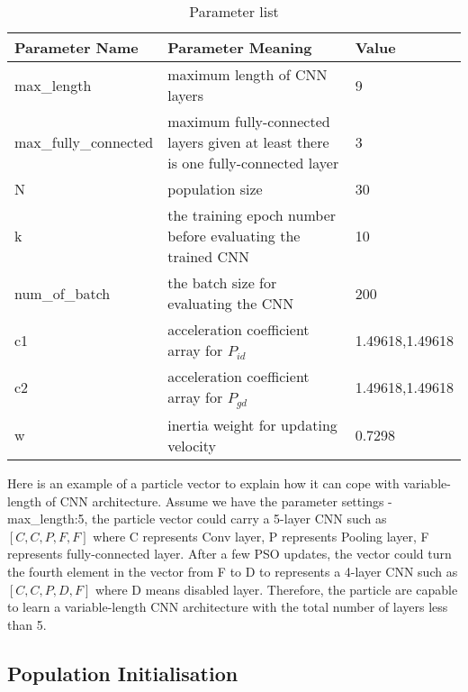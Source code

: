 \documentclass[conference]{IEEEtran}
\begin{document}
\begin{table}[!t]
	\renewcommand{\arraystretch}{1.3}
	\caption{Parameter list}
	\label{table:ParameterList}
	\centering
	\begin{tabular}{|p{2.5cm}|p{3cm}|p{2cm}|}
		\hline
		Parameter Name & Parameter Meaning & Value\\
		\hline
		max\_length & maximum length of CNN layers & 9\\
		\hline
		max\_fully\_connected & maximum fully-connected layers given at least there is one fully-connected layer & 3\\
		\hline
		N & population size & 30\\
		\hline
		k & the training epoch number before evaluating the trained CNN & 10\\
		\hline
		num\_of\_batch & the batch size for evaluating the CNN & 200\\
		\hline
		c1 & acceleration coefficient array for $P_{id}$ & 1.49618,1.49618\\
		\hline
		c2 & acceleration coefficient array for $P_{gd}$ & 1.49618,1.49618\\
		\hline
		w & inertia weight for updating velocity & 0.7298\\
		\hline
	\end{tabular}
\end{table}

Here is an example of a particle vector to explain how it can cope with variable-length of CNN architecture. Assume we have the parameter settings - max\_length:5, the particle vector could carry a 5-layer CNN such as $[C, C, P, F, F]$ where C represents Conv layer, P represents Pooling layer, F represents fully-connected layer. After a few PSO updates, the vector could turn the fourth element in the vector from F to D to represents a 4-layer CNN such as $[C, C, P, D, F]$ where D means disabled layer. Therefore, the particle are capable to learn a variable-length CNN architecture with the total number of layers less than 5. 

\subsection{Population Initialisation}
\end{document}
